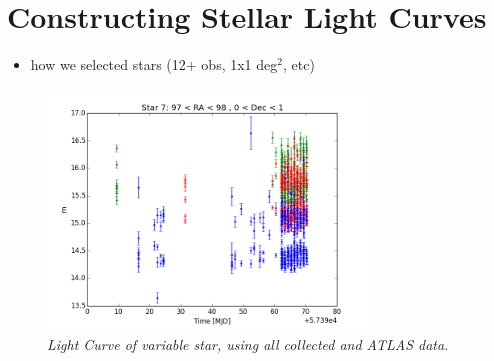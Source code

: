 \documentclass[aps,prl,twocolumn,superscriptaddress]{revtex4-1}
\begin{document}

\section{Constructing Stellar Light Curves}


\begin{itemize}
	\item{} how we selected stars (12+ obs, 1x1 deg$^2$, etc)
\end{itemize}



\begin{figure}[H]
 \centering
 	\includegraphics[width=3.35in]{figures/LC/star7_97_98_0_1.png}
 \caption{\it \small{Light Curve of variable star, using all collected and ATLAS data.}}
 \label{fig:LC7}
\end{figure}
\end{document}
